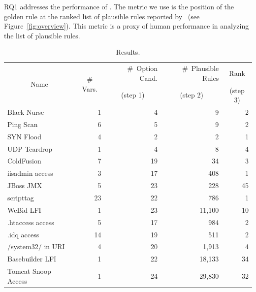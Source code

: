 \documentclass[conference]{IEEEtran}
\begin{document}
RQ1 addresses the performance of \tname. The metric we use is the
position of the golden rule at the ranked list of plausible rules
reported by \tname\ (see Figure~\ref{fig:overview}). This metric is a
proxy of human performance in analyzing the list of plausible rules.

\renewcommand{\arraystretch}{0.7}
\setlength{\tabcolsep}{2pt}
\begin{table}[t!]
  \footnotesize
  \caption{\label{table:results}Results.}
  \vspace{-2ex}
  \centering
  \begin{tabular}{lrrrr}
    \toprule
    \multicolumn{1}{c}{\multirow{2}{*}{Name}} &
    \multicolumn{1}{c}{\multirow{2}{*}{\# Vars.}} &
    \#~Option Cand. &
    \#~Plausible Rules &    
    \multicolumn{1}{c}{Rank} \\

     &
    \multicolumn{1}{c}{} &
    \multicolumn{1}{c}{(step 1)} &
    \multicolumn{1}{c}{(step 2)} &    
    \multicolumn{1}{c}{(step 3)} \\

    \midrule
    Black Nurse & 1 & 4 & 9 & 2 \\    
    Ping Scan & 6 & 5 & 9 & 2 \\
    SYN Flood & 4 & 2 & 2 & 1 \\
    UDP Teardrop & 1 & 4 & 8 & 4 \\
    \midrule
    ColdFusion & 7 & 19 & 34 & 3\\
    iisadmin access & 3 & 17 & 408 & 1 \\        
    JBoss JMX & 5 & 23 & 228 & 45 \\
    scripttag & 23 & 22 & 786 & 1 \\
    WeBid LFI & 1 & 23 & 11,100 & 10\\    
    .htaccess access & 5 & 17 & 984 & 2\\
    .idq access & 14 & 19 & 511 & 2 \\
    /system32/ in URI & 4 & 20 & 1,913 & 4 \\
    Basebuilder LFI & 1 & 22 & 18,133 & 34 \\
    Tomcat Snoop Access & 1 & 24 & 29,830 & 32 \\
    \bottomrule
  \end{tabular}
\end{table}
\end{document}
